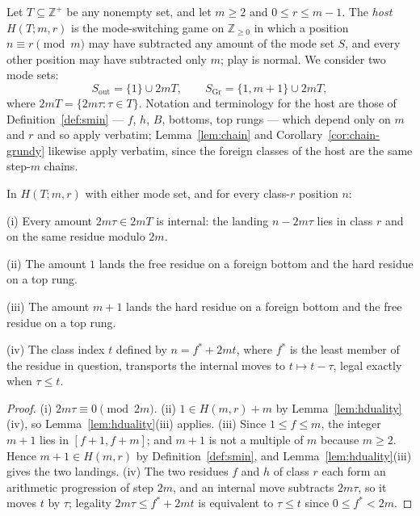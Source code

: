 \begin{definition}\label{def:host}
Let $T \subseteq \mathbb{Z}^+$ be any nonempty set, and let $m \ge 2$ and
$0 \le r \le m-1$. The \emph{host} $H(T; m, r)$ is the mode-switching
game on $\mathbb{Z}_{\ge 0}$ in which a position $n \equiv r \pmod m$ may
have subtracted any amount of the mode set $S$, and every other position
may have subtracted only $m$; play is normal. We consider two mode sets:
\[ S_{\mathrm{out}} = \{1\} \cup 2mT, \qquad
S_{\mathrm{Gr}} = \{1, m+1\} \cup 2mT, \]
where $2mT = \{2m\tau : \tau \in T\}$. Notation and terminology for the
host are those of Definition~\ref{def:smin} --- $f$, $h$, $B$, bottoms,
top rungs --- which depend only on $m$ and $r$ and so apply verbatim;
Lemma~\ref{lem:chain} and Corollary~\ref{cor:chain-grundy} likewise apply
verbatim, since the foreign classes of the host are the same step-$m$
chains.
\end{definition}

\begin{lemma}\label{lem:host-geometry}
In $H(T; m, r)$ with either mode set, and for every class-$r$ position
$n$:

(i) Every amount $2m\tau \in 2mT$ is internal: the landing $n - 2m\tau$
lies in class $r$ and on the same residue modulo $2m$.

(ii) The amount $1$ lands the free residue on a foreign bottom and the
hard residue on a top rung.

(iii) The amount $m+1$ lands the hard residue on a foreign bottom and the
free residue on a top rung.

(iv) The class index $t$ defined by $n = f^* + 2mt$, where $f^*$ is the
least member of the residue in question, transports the internal moves to
$t \mapsto t - \tau$, legal exactly when $\tau \le t$.
\end{lemma}
\begin{proof}
(i) $2m\tau \equiv 0 \pmod{2m}$. (ii) $1 \in H(m,r) + m$ by
Lemma~\ref{lem:hduality}(iv), so Lemma~\ref{lem:hduality}(iii) applies.
(iii) Since $1 \le f \le m$, the integer $m+1$ lies in $[f+1, f+m]$; and
$m+1$ is not a multiple of $m$ because $m \ge 2$. Hence
$m+1 \in H(m,r)$ by Definition~\ref{def:smin}, and
Lemma~\ref{lem:hduality}(iii) gives the two landings. (iv) The two
residues $f$ and $h$ of class $r$ each form an arithmetic progression of
step $2m$, and an internal move subtracts $2m\tau$, so it moves $t$ by
$\tau$; legality $2m\tau \le f^* + 2mt$ is equivalent to $\tau \le t$
since $0 \le f^* < 2m$.
\end{proof}

